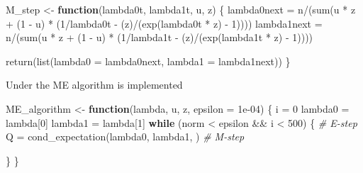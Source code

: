 \documentclass[
]{article}
\newenvironment{Shaded}{\begin{snugshade}}{\end{snugshade}}
\newcommand{\AttributeTok}[1]{\textcolor[rgb]{0.77,0.63,0.00}{#1}}
\newcommand{\CommentTok}[1]{\textcolor[rgb]{0.56,0.35,0.01}{\textit{#1}}}
\newcommand{\ControlFlowTok}[1]{\textcolor[rgb]{0.13,0.29,0.53}{\textbf{#1}}}
\newcommand{\DecValTok}[1]{\textcolor[rgb]{0.00,0.00,0.81}{#1}}
\newcommand{\FloatTok}[1]{\textcolor[rgb]{0.00,0.00,0.81}{#1}}
\newcommand{\FunctionTok}[1]{\textcolor[rgb]{0.00,0.00,0.00}{#1}}
\newcommand{\NormalTok}[1]{#1}
\newcommand{\OtherTok}[1]{\textcolor[rgb]{0.56,0.35,0.01}{#1}}
\newcommand{\SpecialCharTok}[1]{\textcolor[rgb]{0.00,0.00,0.00}{#1}}
\begin{document}
\begin{Shaded}
\begin{Highlighting}[]
\NormalTok{M\_step }\OtherTok{\textless{}{-}} \ControlFlowTok{function}\NormalTok{(lambda0t, lambda1t, u, z) \{}
\NormalTok{    lambda0next }\OtherTok{=}\NormalTok{ n}\SpecialCharTok{/}\NormalTok{(}\FunctionTok{sum}\NormalTok{(u }\SpecialCharTok{*}\NormalTok{ z }\SpecialCharTok{+}\NormalTok{ (}\DecValTok{1} \SpecialCharTok{{-}}\NormalTok{ u) }\SpecialCharTok{*}\NormalTok{ (}\DecValTok{1}\SpecialCharTok{/}\NormalTok{lambda0t }\SpecialCharTok{{-}}\NormalTok{ (z)}\SpecialCharTok{/}\NormalTok{(}\FunctionTok{exp}\NormalTok{(lambda0t }\SpecialCharTok{*}\NormalTok{ z) }\SpecialCharTok{{-}}
        \DecValTok{1}\NormalTok{))))}
\NormalTok{    lambda1next }\OtherTok{=}\NormalTok{ n}\SpecialCharTok{/}\NormalTok{(}\FunctionTok{sum}\NormalTok{(u }\SpecialCharTok{*}\NormalTok{ z }\SpecialCharTok{+}\NormalTok{ (}\DecValTok{1} \SpecialCharTok{{-}}\NormalTok{ u) }\SpecialCharTok{*}\NormalTok{ (}\DecValTok{1}\SpecialCharTok{/}\NormalTok{lambda1t }\SpecialCharTok{{-}}\NormalTok{ (z)}\SpecialCharTok{/}\NormalTok{(}\FunctionTok{exp}\NormalTok{(lambda1t }\SpecialCharTok{*}\NormalTok{ z) }\SpecialCharTok{{-}}
        \DecValTok{1}\NormalTok{))))}

    \FunctionTok{return}\NormalTok{(}\FunctionTok{list}\NormalTok{(}\AttributeTok{lambda0 =}\NormalTok{ lambda0next, }\AttributeTok{lambda1 =}\NormalTok{ lambda1next))}
\NormalTok{\}}
\end{Highlighting}
\end{Shaded}

Under the ME algorithm is implemented

\begin{Shaded}
\begin{Highlighting}[]
\NormalTok{ME\_algorithm }\OtherTok{\textless{}{-}} \ControlFlowTok{function}\NormalTok{(lambda, u, z, }\AttributeTok{epsilon =} \FloatTok{1e{-}04}\NormalTok{) \{}
\NormalTok{    i }\OtherTok{=} \DecValTok{0}
\NormalTok{    lambda0 }\OtherTok{=}\NormalTok{ lambda[}\DecValTok{0}\NormalTok{]}
\NormalTok{    lambda1 }\OtherTok{=}\NormalTok{ lambda[}\DecValTok{1}\NormalTok{]}
    \ControlFlowTok{while}\NormalTok{ (norm }\SpecialCharTok{\textless{}}\NormalTok{ epsilon }\SpecialCharTok{\&\&}\NormalTok{ i }\SpecialCharTok{\textless{}} \DecValTok{500}\NormalTok{) \{}
        \CommentTok{\# E{-}step}
\NormalTok{        Q }\OtherTok{=} \FunctionTok{cond\_expectation}\NormalTok{(lambda0, lambda1, )}
        \CommentTok{\# M{-}step}

\NormalTok{    \}}
\NormalTok{\}}
\end{Highlighting}
\end{Shaded}
\end{document}
